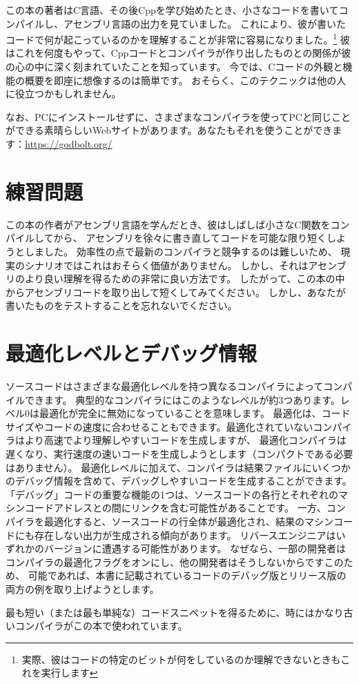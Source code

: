 
この本の著者はC言語、その後Cppを学び始めたとき、小さなコードを書いてコンパイルし、アセンブリ言語の出力を見ていました。 これにより、彼が書いたコードで何が起こっているのかを理解することが非常に容易になりました。\footnote{実際、彼はコードの特定のビットが何をしているのか理解できないときもこれを実行します}
彼はこれを何度もやって、Cppコードとコンパイラが作り出したものとの関係が彼の心の中に深く刻まれていたことを知っています。 今では、Cコードの外観と機能の概要を即座に想像するのは簡単です。 おそらく、このテクニックは他の人に役立つかもしれません。


なお、PCにインストールせずに、さまざまなコンパイラを使ってPCと同じことができる素晴らしいWebサイトがあります。あなたもそれを使うことができます：\url{https://godbolt.org/}

\section*{練習問題}

この本の作者がアセンブリ言語を学んだとき、彼はしばしば小さなC関数をコンパイルしてから、
アセンブリを徐々に書き直してコードを可能な限り短くしようとしました。 効率性の点で最新のコンパイラと競争するのは難しいため、
現実のシナリオではこれはおそらく価値がありません。 しかし、それはアセンブリのより良い理解を得るための非常に良い方法です。 
したがって、この本の中からアセンブリコードを取り出して短くしてみてください。 
しかし、あなたが書いたものをテストすることを忘れないでください。

\section*{最適化レベルとデバッグ情報}

ソースコードはさまざまな最適化レベルを持つ異なるコンパイラによってコンパイルできます。
典型的なコンパイラにはこのようなレベルが約3つあります。レベル0は最適化が完全に無効になっていることを意味します。
最適化は、コードサイズやコードの速度に合わせることもできます。最適化されていないコンパイラはより高速でより理解しやすいコードを生成しますが、
最適化コンパイラは遅くなり、実行速度の速いコードを生成しようとします（コンパクトである必要はありません）。
最適化レベルに加えて、コンパイラは結果ファイルにいくつかのデバッグ情報を含めて、デバッグしやすいコードを生成することができます。
「デバッグ」コードの重要な機能の1つは、ソースコードの各行とそれぞれのマシンコードアドレスとの間にリンクを含む可能性があることです。
一方、コンパイラを最適化すると、ソースコードの行全体が最適化され、結果のマシンコードにも存在しない出力が生成される傾向があります。
リバースエンジニアはいずれかのバージョンに遭遇する可能性があります。
なぜなら、一部の開発者はコンパイラの最適化フラグをオンにし、他の開発者はそうしないからですこのため、
可能であれば、本書に記載されているコードのデバッグ版とリリース版の両方の例を取り上げようとします。

最も短い（または最も単純な）コードスニペットを得るために、時にはかなり古いコンパイラがこの本で使われています。
